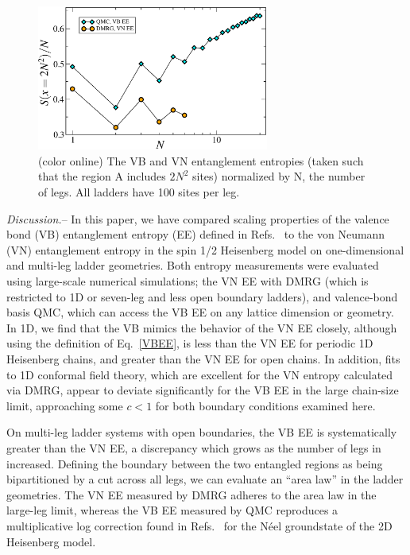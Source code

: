 \documentclass[prl,aps,twocolumn,floatfix,amsmath,amssymb,superscriptaddress,tightenlines]{revtex4}
\begin{document}
\begin{figure} { \includegraphics[width=3in]{fig4.eps} \caption{(color
online) The VB and VN entanglement entropies (taken such that the region A
includes $2N^2$ sites) normalized by N, the number of legs.  All ladders
have 100 sites per leg.  \label{zigzag}}} \end{figure}

{\it Discussion.}-- In this paper, we have compared scaling properties of
the valence bond (VB) entanglement entropy (EE) defined in
Refs.~\cite{Alet,Chh} to the von Neumann (VN) entanglement entropy in the
spin 1/2 Heisenberg model on one-dimensional and multi-leg ladder
geometries.  Both entropy measurements were evaluated using large-scale
numerical simulations; the VN EE with DMRG (which is restricted to 1D or
seven-leg and less open boundary ladders), and valence-bond basis QMC,
which can access the VB EE on any lattice dimension or geometry.  In 1D,
we find that the VB mimics the behavior of the VN EE closely, although
using the definition of Eq.~\eqref{VBEE}, is less than the VN EE for
periodic 1D Heisenberg chains, and greater than the VN EE for open chains.
In addition, fits to 1D conformal field theory, which are excellent for
the VN entropy calculated via DMRG, appear to deviate significantly for
the VB EE in the large chain-size limit, approaching some $c<1$ for both
boundary conditions examined here.

On multi-leg ladder systems with open boundaries, the VB EE is
systematically greater than the VN EE, a discrepancy which grows as the
number of legs in increased.  Defining the boundary between the two
entangled regions as being bipartitioned by a cut across all legs, we can
evaluate an ``area law'' in the ladder geometries.  The VN EE measured by
DMRG adheres to the area law in the large-leg limit, whereas the VB EE
measured by QMC reproduces a multiplicative log correction found in
Refs.~\cite{Alet,Chh} for the N\'eel groundstate of the 2D Heisenberg
model.
\end{document}

